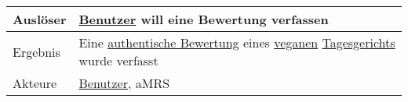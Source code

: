 \begin{table}[H]
\begin{tabularx}{\textwidth}{| l | X |}
        \hline
        Auslöser           & \hyperref[gls:nutzer]{Benutzer} will eine Bewertung verfassen                                                                                                                                                                                                                                                                                                                                                                                                                                                                                                                                                                                                                                                                     \\
        \hline
        Ergebnis           & Eine \hyperref[gls:authentischeBewertung]{authentische Bewertung} eines \hyperref[gls:vegan]{veganen} \hyperref[gls:tagesgericht]{Tagesgerichts} wurde verfasst                                                                                                                                                                                                                                                                                                                                                                                                                                                                                                                                                                   \\
        \hline
        Akteure            & \hyperref[gls:nutzer]{Benutzer}, \ac{aMRS}                                                                                                                                                                                                                                                                                                                                                                                                                                                                                                                                                                                                                                                                                        \\
        \hline
    \end{tabularx}
\end{table}



